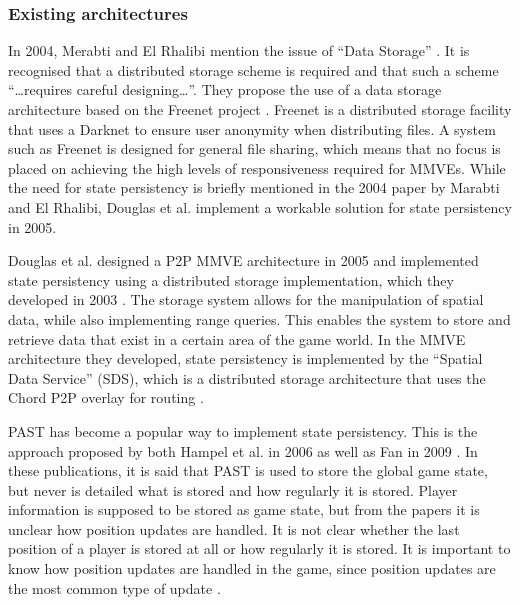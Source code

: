 \subsubsection{Existing architectures}

In 2004, Merabti and El Rhalibi mention the issue of ``Data Storage'' \cite{using_freenet_storage}. It is recognised that a distributed storage scheme is required and that such a scheme ``\ldots requires careful designing\ldots''. They propose the use of a data storage architecture based on the Freenet project \cite{clarke_freenet}. Freenet is a distributed storage facility that uses a Darknet to ensure user anonymity when distributing files. A system such as Freenet is designed for general file sharing, which means that no focus is placed on achieving the high levels of responsiveness required for MMVEs. While the need for state persistency is briefly mentioned in the 2004 paper by Marabti and El Rhalibi, Douglas et
al. implement a workable solution for state persistency in 2005.

Douglas et al. designed a P2P MMVE architecture in 2005 \cite{Douglas05enablingmassively} and implemented state persistency using a distributed storage implementation, which they developed in 2003 \cite{Harwood03hashingspatial}. The storage system allows for the manipulation of spatial data, while also implementing range queries. This enables the system to store and retrieve data that exist in a certain area of the game world. In the MMVE architecture they developed, state persistency is implemented by the ``Spatial Data Service'' (SDS), which is a distributed storage architecture that uses the Chord P2P overlay for routing \cite{chord}.

PAST has become a popular way to implement state persistency. This is the approach proposed by both Hampel et al. in 2006 \cite{past_storage_focus} as well as Fan in 2009 \cite{Fan_phd}. In these publications, it is said that PAST is used to store the global game state, but never is detailed what is stored and how regularly it is stored. Player information is supposed to be stored as game state, but from the papers it is unclear how position updates are handled. It is not clear whether the last position of a player is stored at all or how regularly it is stored. It is important to know how position updates are handled in the game, since position updates are the most common type of update \cite{knutsson_p2p_first}.

